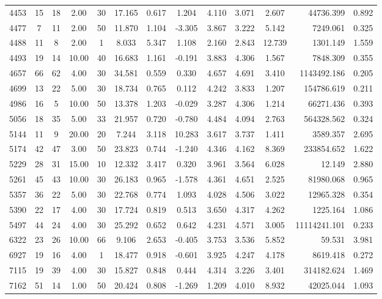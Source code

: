 \documentclass[mnsc]{informs3}
\begin{document}
\begin{APPENDICES}
\begin{longtable}{cccccccccccrc}
4453 & 15 & 18 & 2.00 & 30 & 17.165 & 0.617 & 1.204 & 4.110 & 3.071 & 2.607 & 44736.399 & 0.892 \\
4477 & 7 & 11 & 2.00 & 50 & 11.870 & 1.104 & -3.305 & 3.867 & 3.222 & 5.142 & 7249.061 & 0.325 \\
4488 & 11 & 8 & 2.00 & 1 & 8.033 & 5.347 & 1.108 & 2.160 & 2.843 & 12.739 & 1301.149 & 1.559 \\
4493 & 19 & 14 & 10.00 & 40 & 16.683 & 1.161 & -0.191 & 3.883 & 4.306 & 1.567 & 7848.309 & 0.355 \\
4657 & 66 & 62 & 4.00 & 30 & 34.581 & 0.559 & 0.330 & 4.657 & 4.691 & 3.410 & 1143492.186 & 0.205 \\
4699 & 13 & 22 & 5.00 & 30 & 18.734 & 0.765 & 0.112 & 4.242 & 3.833 & 1.207 & 154786.619 & 0.211 \\
4986 & 16 & 5 & 10.00 & 50 & 13.378 & 1.203 & -0.029 & 3.287 & 4.306 & 1.214 & 66271.436 & 0.393 \\
5056 & 18 & 35 & 5.00 & 33 & 21.957 & 0.720 & -0.780 & 4.484 & 4.094 & 2.763 & 564328.562 & 0.324 \\
5144 & 11 & 9 & 20.00 & 20 & 7.244 & 3.118 & 10.283 & 3.617 & 3.737 & 1.411 & 3589.357 & 2.695 \\
5174 & 42 & 47 & 3.00 & 50 & 23.823 & 0.744 & -1.240 & 4.346 & 4.162 & 8.369 & 233854.652 & 1.622 \\
5229 & 28 & 31 & 15.00 & 10 & 12.332 & 3.417 & 0.320 & 3.961 & 3.564 & 6.028 & 12.149 & 2.880 \\
5261 & 45 & 43 & 10.00 & 30 & 26.183 & 0.965 & -1.578 & 4.361 & 4.651 & 2.525 & 81980.068 & 0.965 \\
5357 & 36 & 22 & 5.00 & 30 & 22.768 & 0.774 & 1.093 & 4.028 & 4.506 & 3.022 & 12965.328 & 0.354 \\
5390 & 22 & 17 & 4.00 & 30 & 17.724 & 0.819 & 0.513 & 3.650 & 4.317 & 4.262 & 1225.164 & 1.086 \\
5497 & 44 & 24 & 4.00 & 30 & 25.292 & 0.652 & 0.642 & 4.231 & 4.571 & 3.005 & 11114241.101 & 0.233 \\
6322 & 23 & 26 & 10.00 & 66 & 9.106 & 2.653 & -0.405 & 3.753 & 3.536 & 5.852 & 59.531 & 3.981 \\
6927 & 19 & 16 & 4.00 & 1 & 18.477 & 0.918 & -0.601 & 3.925 & 4.247 & 4.178 & 8619.418 & 0.272 \\
7115 & 19 & 39 & 4.00 & 30 & 15.827 & 0.848 & 0.444 & 4.314 & 3.226 & 3.401 & 314182.624 & 1.469 \\
7162 & 51 & 14 & 1.00 & 50 & 20.424 & 0.808 & -1.269 & 1.209 & 4.010 & 8.932 & 42025.044 & 1.093 \\

\end{longtable}
\end{APPENDICES}
\end{document}
